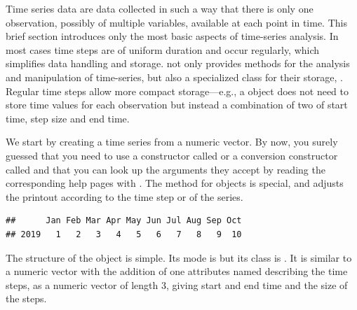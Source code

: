 \documentclass[krantz2]{krantz}\usepackage{knitr}
\begin{document}
Time series data are data collected in such a way that there is only one observation, possibly of multiple variables, available at each point in time. This brief section introduces only the most basic aspects of time-series analysis. In most cases time steps are of uniform duration and occur regularly, which simplifies data handling and storage. \Rlang not only provides methods for the analysis and manipulation of time-series, but also a specialized class for their storage, . Regular time steps allow more compact storage---e.g.,  a  object does not need to store time values for each observation but instead a combination of two of start time, step size and end time.

We start by creating a time series from a numeric vector. By now, you surely guessed that you need to use a constructor called  or a conversion constructor called  and that you can look up the arguments they accept by reading the corresponding help pages with . The  method for  objects is special, and adjusts the printout according to the time step or  of the series.

\begin{knitrout}\footnotesize
{}\color{fgcolor}\begin{kframe}
\begin{alltt}
 \hlkwb{<-} \hlstd{(}\hlopt{:}\hlstd{,}  \hlstd{=} \hlstd{,}  \hlstd{=} \hlopt{/}\hlstd{)}
\end{alltt}
\begin{verbatim}
##      Jan Feb Mar Apr May Jun Jul Aug Sep Oct
## 2019   1   2   3   4   5   6   7   8   9  10
\end{verbatim}
\end{kframe}
\end{knitrout}

The structure of the  object is simple. Its mode is  but its class is . It is similar to a numeric vector with the addition of one attributes named  describing the time steps, as a numeric vector of length 3, giving start and end time and the size of the steps.
\end{document}
